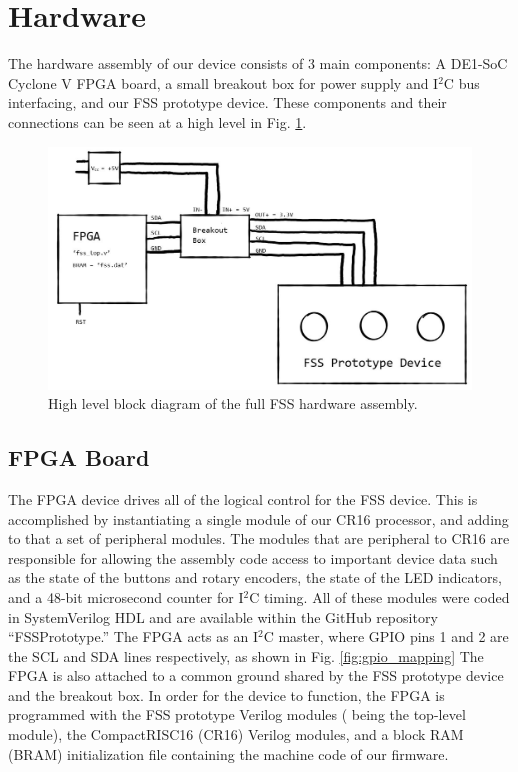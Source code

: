 \documentclass[conference]{IEEEtran}
\begin{document}
\section{Hardware}
The hardware assembly of our device consists of 3 main components: A DE1-SoC Cyclone V FPGA board, a small breakout box for power supply and I$^2$C bus interfacing, and our FSS prototype device. These components and their connections can be seen at a high level in Fig. \ref{fig:full_fss_block_diagram}.

\begin{figure}[bhtp]
    \centering
    \includegraphics[scale=0.6]{./resources/figures/full_assembly_block_diagram.jpg}
    \caption{High level block diagram of the full FSS hardware assembly.}
    \label{fig:full_fss_block_diagram}
\end{figure}

\subsection{FPGA Board}
The FPGA device drives all of the logical control for the FSS device. This is accomplished by instantiating a single module of our CR16 processor, and adding to that a set of peripheral modules. The modules that are peripheral to CR16 are responsible for allowing the assembly code access to important device data such as the state of the buttons and rotary encoders, the state of the LED indicators, and a 48-bit microsecond counter for I$^2$C timing. All of these modules were coded in SystemVerilog HDL and are available within the GitHub repository ``FSSPrototype.'' The FPGA acts as an I$^2$C master, where GPIO pins 1 and 2 are the SCL and SDA lines respectively, as shown in Fig. \ref{fig:gpio_mapping} The FPGA is also attached to a common ground shared by the FSS prototype device and the breakout box. In order for the device to function, the FPGA is programmed with the FSS prototype Verilog modules ( being the top-level module), the CompactRISC16 (CR16) Verilog modules, and a block RAM (BRAM) initialization file containing the machine code of our firmware.
\end{document}
